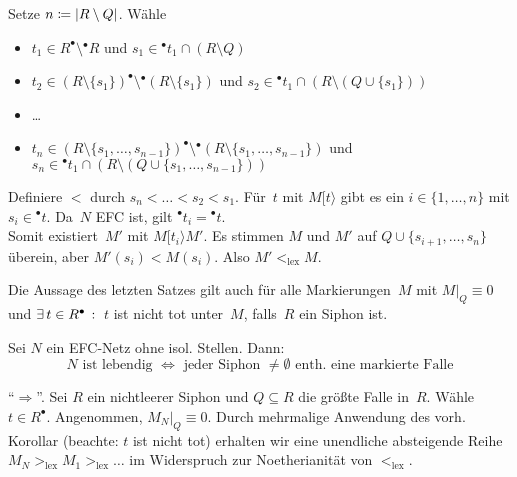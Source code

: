 \documentclass{cheat-sheet}
\newcommand{\preset}[1]{{}^\bullet{#1}} %
\newcommand{\postset}[1]{{#1}^\bullet} %
\newcommand{\activeTransition}[1]{[{#1}\rangle} %
\begin{document}
\begin{beweis}
  Setze $n \coloneqq \lvert R \setminus Q\rvert$.
  Wähle
  \begin{itemize}
    \item $t_1 \in \postset{R} \setminus \preset{R}$ und $s_1 \in \preset{t_1} \cap (R \setminus Q)$
    \item $t_2 \in \postset{(R \setminus \{ s_1 \})} \setminus \preset{(R \setminus \{ s_1 \})}$ und $s_2 \in \preset{t_1} \cap (R \setminus (Q \cup \{ s_1 \}))$
    \item \ldots
    \item $t_n \in \postset{(R \setminus \{ s_1, \ldots, s_{n-1} \})} \setminus \preset{(R \setminus \{ s_1, \ldots, s_{n-1} \})}$ und $s_n \in \preset{t_1} \cap (R \setminus (Q \cup \{ s_1, \ldots, s_{n-1} \}))$
  \end{itemize}
  Definiere ${<}$ durch $s_n < \ldots < s_2 < s_1$.
  Für~$t$ mit $M \activeTransition{t}$ gibt es ein $i \in \{ 1, \ldots, n \}$ mit $s_i \in \preset{t}$.
  Da~$N$ EFC ist, gilt $\preset{t_i} = \preset{t}$. \\
  Somit existiert~$M'$ mit $M \activeTransition{t_i} M'$.
  Es stimmen $M$ und $M'$ auf $Q \cup \{ s_{i+1}, \ldots, s_n \}$ überein, aber $M'(s_i) < M(s_i)$.
  Also $M' <_\mathrm{lex} M$.
\end{beweis}

\begin{kor}
  Die Aussage des letzten Satzes gilt auch für alle Markierungen~$M$ mit $M|_Q \equiv 0$ und $\ex{t \in \postset{R}}$ $t$ ist nicht tot unter~$M$, falls~$R$ ein Siphon ist.
\end{kor}

\begin{satz}
  Sei $N$ ein EFC-Netz ohne isol. Stellen.
  Dann:
  \[
    \text{$N$ ist lebendig $\iff$ jeder Siphon $\neq \emptyset$ enth. eine markierte Falle}
  \]
\end{satz}

\begin{beweis}
  "`$\Rightarrow$"'.
  Sei $R$ ein nichtleerer Siphon und $Q \subseteq R$ die größte Falle in~$R$.
  Wähle $t \in \postset{R}$.
  Angenommen, $M_N|_Q \equiv 0$.
  Durch mehrmalige Anwendung des vorh. Korollar (beachte: $t$ ist nicht tot) erhalten wir eine unendliche absteigende Reihe $M_N >_\mathrm{lex} M_1 >_\mathrm{lex} \ldots$ im Widerspruch zur Noetherianität von ${<_\mathrm{lex}}$.
\end{beweis}
\end{document}
